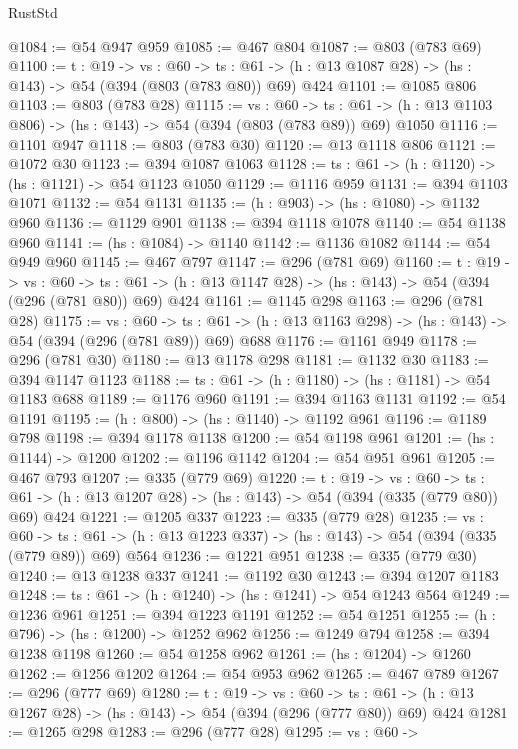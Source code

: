 \begin{lexlean}{RustStd}
\begin{coremodule}
@1084 := @54 @947 @959
@1085 := @467 @804
@1087 := @803 (@783 @69)
@1100 := {t : @19} ->
  {vs : @60} ->
  {ts : @61} -> (h : @13 @1087 @28) -> (hs : @143) -> @54 (@394 (@803 (@783 @80)) @69) @424
@1101 := @1085 @806
@1103 := @803 (@783 @28)
@1115 := {vs : @60} ->
  {ts : @61} -> (h : @13 @1103 @806) -> (hs : @143) -> @54 (@394 (@803 (@783 @89)) @69) @1050
@1116 := @1101 @947
@1118 := @803 (@783 @30)
@1120 := @13 @1118 @806
@1121 := @1072 @30
@1123 := @394 @1087 @1063
@1128 := {ts : @61} -> (h : @1120) -> (hs : @1121) -> @54 @1123 @1050
@1129 := @1116 @959
@1131 := @394 @1103 @1071
@1132 := @54 @1131
@1135 := (h : @903) -> (hs : @1080) -> @1132 @960
@1136 := @1129 @901
@1138 := @394 @1118 @1078
@1140 := @54 @1138 @960
@1141 := (hs : @1084) -> @1140
@1142 := @1136 @1082
@1144 := @54 @949 @960
@1145 := @467 @797
@1147 := @296 (@781 @69)
@1160 := {t : @19} ->
  {vs : @60} ->
  {ts : @61} -> (h : @13 @1147 @28) -> (hs : @143) -> @54 (@394 (@296 (@781 @80)) @69) @424
@1161 := @1145 @298
@1163 := @296 (@781 @28)
@1175 := {vs : @60} ->
  {ts : @61} -> (h : @13 @1163 @298) -> (hs : @143) -> @54 (@394 (@296 (@781 @89)) @69) @688
@1176 := @1161 @949
@1178 := @296 (@781 @30)
@1180 := @13 @1178 @298
@1181 := @1132 @30
@1183 := @394 @1147 @1123
@1188 := {ts : @61} -> (h : @1180) -> (hs : @1181) -> @54 @1183 @688
@1189 := @1176 @960
@1191 := @394 @1163 @1131
@1192 := @54 @1191
@1195 := (h : @800) -> (hs : @1140) -> @1192 @961
@1196 := @1189 @798
@1198 := @394 @1178 @1138
@1200 := @54 @1198 @961
@1201 := (hs : @1144) -> @1200
@1202 := @1196 @1142
@1204 := @54 @951 @961
@1205 := @467 @793
@1207 := @335 (@779 @69)
@1220 := {t : @19} ->
  {vs : @60} ->
  {ts : @61} -> (h : @13 @1207 @28) -> (hs : @143) -> @54 (@394 (@335 (@779 @80)) @69) @424
@1221 := @1205 @337
@1223 := @335 (@779 @28)
@1235 := {vs : @60} ->
  {ts : @61} -> (h : @13 @1223 @337) -> (hs : @143) -> @54 (@394 (@335 (@779 @89)) @69) @564
@1236 := @1221 @951
@1238 := @335 (@779 @30)
@1240 := @13 @1238 @337
@1241 := @1192 @30
@1243 := @394 @1207 @1183
@1248 := {ts : @61} -> (h : @1240) -> (hs : @1241) -> @54 @1243 @564
@1249 := @1236 @961
@1251 := @394 @1223 @1191
@1252 := @54 @1251
@1255 := (h : @796) -> (hs : @1200) -> @1252 @962
@1256 := @1249 @794
@1258 := @394 @1238 @1198
@1260 := @54 @1258 @962
@1261 := (hs : @1204) -> @1260
@1262 := @1256 @1202
@1264 := @54 @953 @962
@1265 := @467 @789
@1267 := @296 (@777 @69)
@1280 := {t : @19} ->
  {vs : @60} ->
  {ts : @61} -> (h : @13 @1267 @28) -> (hs : @143) -> @54 (@394 (@296 (@777 @80)) @69) @424
@1281 := @1265 @298
@1283 := @296 (@777 @28)
@1295 := {vs : @60} ->

\end{coremodule}
\end{lexlean}
